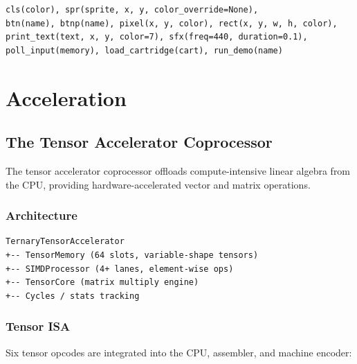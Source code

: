 \documentclass[10pt,a4paper,twoside]{book}
\begin{document}
\begin{verbatim}
cls(color), spr(sprite, x, y, color_override=None),
btn(name), btnp(name), pixel(x, y, color), rect(x, y, w, h, color),
print_text(text, x, y, color=7), sfx(freq=440, duration=0.1),
poll_input(memory), load_cartridge(cart), run_demo(name)
\end{verbatim}

\part{Acceleration}

\chapter{The Tensor Accelerator Coprocessor}
\label{ch:accelerator}

The tensor accelerator coprocessor offloads compute-intensive linear algebra from the
CPU, providing hardware-accelerated vector and matrix operations.

\section{Architecture}

\begin{verbatim}
TernaryTensorAccelerator
+-- TensorMemory (64 slots, variable-shape tensors)
+-- SIMDProcessor (4+ lanes, element-wise ops)
+-- TensorCore (matrix multiply engine)
+-- Cycles / stats tracking
\end{verbatim}

\section{Tensor ISA}

Six tensor opcodes are integrated into the CPU, assembler, and machine encoder:
\end{document}
